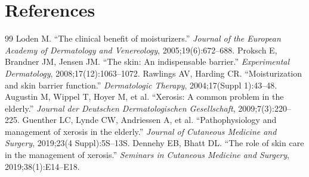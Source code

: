 \section*{References}
\begin{thebibliography}{99}
 Loden M. ``The clinical benefit of moisturizers.'' \textit{Journal of the European Academy of Dermatology and Venereology}, 2005;19(6):672--688.
 Proksch E, Brandner JM, Jensen JM. ``The skin: An indispensable barrier.'' \textit{Experimental Dermatology}, 2008;17(12):1063--1072.
 Rawlings AV, Harding CR. ``Moisturization and skin barrier function.'' \textit{Dermatologic Therapy}, 2004;17(Suppl 1):43--48.
 Augustin M, Wippel T, Hoyer M, et al. ``Xerosis: A common problem in the elderly.'' \textit{Journal der Deutschen Dermatologischen Gesellschaft}, 2009;7(3):220--225.
 Guenther LC, Lynde CW, Andriessen A, et al. ``Pathophysiology and management of xerosis in the elderly.'' \textit{Journal of Cutaneous Medicine and Surgery}, 2019;23(4 Suppl):5S--13S.
 Dennehy EB, Bhatt DL. ``The role of skin care in the management of xerosis.'' \textit{Seminars in Cutaneous Medicine and Surgery}, 2019;38(1):E14--E18.
\end{thebibliography}

